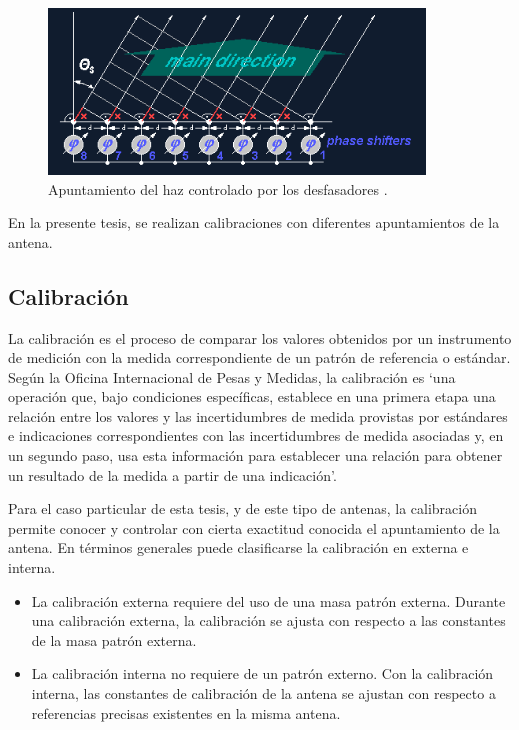 \begin{figure}[H]
 \centering
 \includegraphics[width=10cm]{gfx/beamSteering.png}
 \caption{Apuntamiento del haz controlado por los desfasadores \cite{BeamSteering}.}
\end{figure}

En la presente tesis, se realizan calibraciones con diferentes apuntamientos de la antena. 

\subsection{Calibración}

La calibración es el proceso de comparar los valores obtenidos por un instrumento de medición con la
medida correspondiente de un patrón de referencia o estándar. Según la Oficina Internacional de Pesas y Medidas, la 
calibración es \enquote*{una operación que, bajo condiciones específicas, establece en una primera etapa una relación entre
los valores y las incertidumbres de medida provistas por estándares e indicaciones correspondientes con las incertidumbres de 
medida asociadas y, en un segundo paso, usa esta información para establecer una relación para obtener un resultado de la 
medida a partir de una indicación}.

Para el caso particular de esta tesis, y de este tipo de antenas, la calibración permite conocer y controlar con cierta 
exactitud conocida el apuntamiento de la antena. En términos generales puede clasificarse la calibración en externa e interna. 
\begin{itemize}
	\item La calibración externa requiere del uso de una masa patrón externa. Durante una calibración externa, la calibración se
		ajusta con respecto a las constantes de la masa patrón externa. 
	\item La calibración interna no requiere de un patrón externo. Con la calibración interna, las constantes de calibración de
		la antena se ajustan con respecto a referencias precisas existentes en la misma antena.
\end{itemize}


